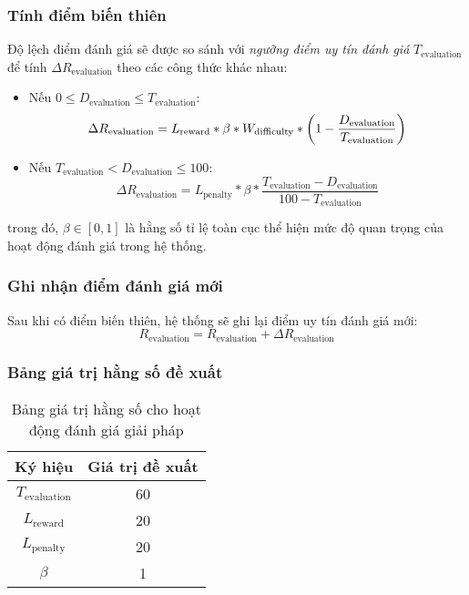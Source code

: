 \subsubsection{Tính điểm biến thiên}

Độ lệch điểm đánh giá sẽ được so sánh với \textit{ngưỡng điểm uy tín đánh giá} $T_{\text{evaluation}}$ để tính $\Delta R_{\text{evaluation}}$ theo các công thức khác nhau:

\begin{itemize}
  \item Nếu $0 \leq D_{\text{evaluation}} \leq  T_{\text{evaluation}}$:
        \[\Delta R_{\text{\text{evaluation}}} = L_{\text{reward}}*\beta*W_{\text{difficulty}} * \left(1 - \frac{D_{\text{evaluation}}}{T_{\text{evaluation}}}\right) \]
  \item Nếu $T_{\text{evaluation}} < D_{\text{evaluation}} \leq 100$:
        \[\Delta R_{{\text{evaluation}}} = L_{\text{penalty}}*\beta * \frac{T_{\text{evaluation}} - D_{\text{evaluation}}}{100-T_{\text{evaluation}}} \]
\end{itemize}
trong đó, $\beta \in [0, 1]$ là hằng số tỉ lệ toàn cục thể hiện mức độ quan trọng của hoạt động đánh giá trong hệ thống.

\subsubsection{Ghi nhận điểm đánh giá mới}

Sau khi có điểm biến thiên, hệ thống sẽ ghi lại điểm uy tín đánh giá mới:
\[R_{\text{evaluation}} = R_{\text{evaluation}} + \Delta R_{\text{evaluation}}\]

\subsubsection{Bảng giá trị hằng số đề xuất}

\begin{table}[H]
  \centering
  \begin{tabular}{|c|c|}
    \hline
    \textbf{Ký hiệu}        & \textbf{Giá trị đề xuất} \\ \hline
    $T_{\text{evaluation}}$ & 60                       \\ \hline
    $L_{\text{reward}}$     & 20                       \\ \hline
    $L_{\text{penalty}}$    & 20                       \\ \hline
    $\beta$                 & 1                        \\ \hline
  \end{tabular}
  \caption{Bảng giá trị hằng số cho hoạt động đánh giá giải pháp}
  \label{tab:suggested-constant-values-for-evaluation}
\end{table}

